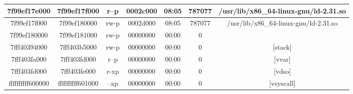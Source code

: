 \documentclass[a4paper]{article}
\begin{document}
\begin{center}
\begin{tabular}{ | c | c | c | c | c | c | c | }
7f99ef17e000 & 7f99ef17f000 & r--p & 0002c000 & 08:05 & 787077 & /usr/lib/x86\_64-linux-gnu/ld-2.31.so \\ \hline
7f99ef17f000 & 7f99ef180000 & rw-p & 0002d000 & 08:05 & 787077 & /usr/lib/x86\_64-linux-gnu/ld-2.31.so \\ \hline
7f99ef180000 & 7f99ef181000 & rw-p & 00000000 & 00:00 & 0 &  \\ \hline
7fff40394000 & 7fff403b5000 & rw-p & 00000000 & 00:00 & 0 & [stack] \\ \hline
7fff403fa000 & 7fff403fd000 & r--p & 00000000 & 00:00 & 0 & [vvar] \\ \hline
7fff403fd000 & 7fff403fe000 & r-xp & 00000000 & 00:00 & 0 & [vdso] \\ \hline
ffffffffff600000 & ffffffffff601000 & --xp & 00000000 & 00:00 & 0 & [vsyscall] \\ \hline
\end{tabular}
\end{center}
\end{document}
